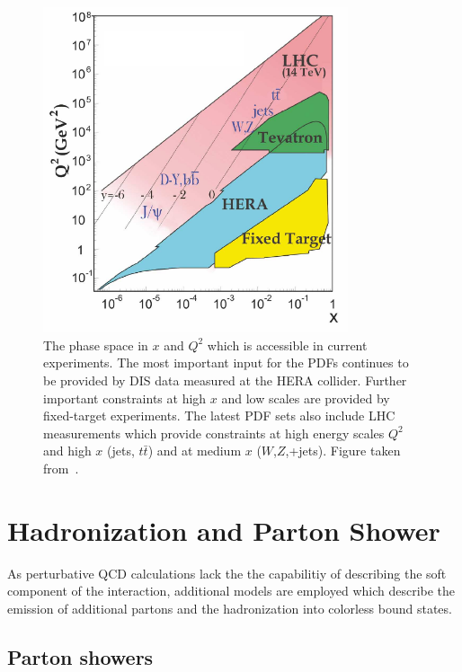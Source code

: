 \begin{figure}[htb] 
    \centering
    \includegraphics[width=0.8\textwidth]{figures/theoretical_foundations/phasespace.pdf}\hfill
    \caption[Kinematic phase space region of the experiments]{The phase space
        in $x$ and $Q^2$ which is accessible in current experiments.  The most
        important input for the PDFs continues to be provided by DIS
        data measured at the HERA collider. Further important constraints at
        high $x$ and low scales are provided by fixed-target experiments. The
        latest PDF sets also include LHC measurements which provide constraints
        at high energy scales $Q^2$ and high $x$ (jets, $t\bar t$) and at medium $x$
        ($W$,$Z$,+jets). Figure taken from~\cite{Agashe:2014kda}.} 
    \label{fig:kinematic_phasepace} 
\end{figure}

\section{Hadronization and Parton Shower}

As perturbative QCD calculations lack the the capabilitiy of describing the
soft component of the interaction, additional models are employed which describe
the emission of additional partons and the hadronization into colorless bound
states. 

\subsection{Parton showers}

